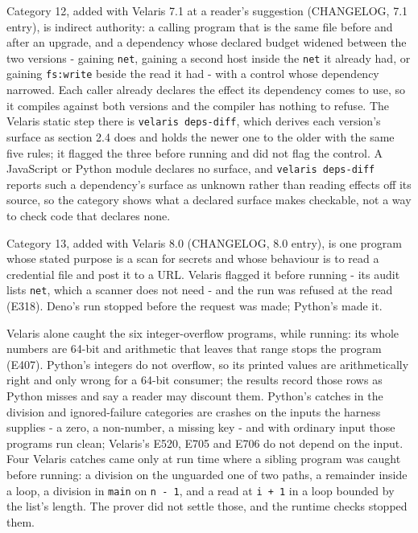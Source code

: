 \documentclass[
]{article}
\newcounter{none} %
\begin{document}
Category 12, added with Velaris 7.1 at a reader's suggestion (CHANGELOG,
7.1 entry), is indirect authority: a calling program that is the same
file before and after an upgrade, and a dependency whose declared budget
widened between the two versions - gaining \texttt{net}, gaining a
second host inside the \texttt{net} it already had, or gaining
\texttt{fs:write} beside the read it had - with a control whose
dependency narrowed. Each caller already declares the effect its
dependency comes to use, so it compiles against both versions and the
compiler has nothing to refuse. The Velaris static step there is
\texttt{velaris\ deps-diff}, which derives each version's surface as
section 2.4 does and holds the newer one to the older with the same five
rules; it flagged the three before running and did not flag the control.
A JavaScript or Python module declares no surface, and
\texttt{velaris\ deps-diff} reports such a dependency's surface as
unknown rather than reading effects off its source, so the category
shows what a declared surface makes checkable, not a way to check code
that declares none.

Category 13, added with Velaris 8.0 (CHANGELOG, 8.0 entry), is one
program whose stated purpose is a scan for secrets and whose behaviour
is to read a credential file and post it to a URL. Velaris flagged it
before running - its audit lists \texttt{net}, which a scanner does not
need - and the run was refused at the read (E318). Deno's run stopped
before the request was made; Python's made it.

Velaris alone caught the six integer-overflow programs, while running:
its whole numbers are 64-bit and arithmetic that leaves that range stops
the program (E407). Python's integers do not overflow, so its printed
values are arithmetically right and only wrong for a 64-bit consumer;
the results record those rows as Python misses and say a reader may
discount them. Python's catches in the division and ignored-failure
categories are crashes on the inputs the harness supplies - a zero, a
non-number, a missing key - and with ordinary input those programs run
clean; Velaris's E520, E705 and E706 do not depend on the input. Four
Velaris catches came only at run time where a sibling program was caught
before running: a division on the unguarded one of two paths, a
remainder inside a loop, a division in \texttt{main} on
\texttt{n\ -\ 1}, and a read at \texttt{i\ +\ 1} in a loop bounded by
the list's length. The prover did not settle those, and the runtime
checks stopped them.
\end{document}
